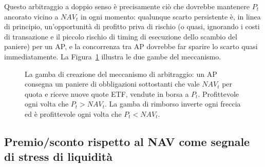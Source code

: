 \documentclass[11pt]{article}
\theoremstyle{definition}
\theoremstyle{remark}
\begin{document}
Questo arbitraggio a doppio senso \`e precisamente ci\`o che dovrebbe mantenere $P_t$ ancorato vicino a $NAV_t$ in ogni momento: qualunque scarto persistente \`e, in linea di principio, un'opportunit\`a di profitto priva di rischio (o quasi, ignorando i costi di transazione e il piccolo rischio di timing di esecuzione dello scambio del paniere) per un AP, e la concorrenza tra AP dovrebbe far sparire lo scarto quasi immediatamente. La Figura~\ref{fig:creation-redemption} illustra le due gambe del meccanismo.

\begin{figure}[H]
\centering
{}
\caption{La gamba di creazione del meccanismo di arbitraggio: un AP consegna un paniere di obbligazioni sottostanti che vale $NAV_t$ per quota e riceve nuove quote ETF, vendute in borsa a $P_t$. Profittevole ogni volta che $P_t>NAV_t$. La gamba di rimborso inverte ogni freccia ed \`e profittevole ogni volta che $P_t<NAV_t$.}
\label{fig:creation-redemption}
\end{figure}

\subsection{Premio/sconto rispetto al NAV come segnale di stress di liquidit\`a}
\label{sec:premdisc}
\end{document}
